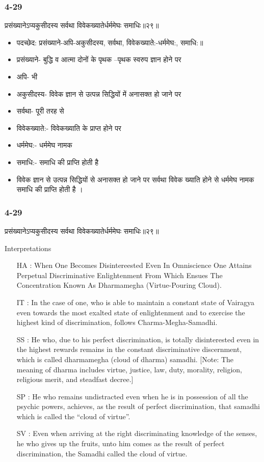 \begin{frame}[fragile]\frametitle{4-29}
\begin{sanskrit}
प्रसंख्यानेऽप्यकुसीदस्य सर्वथा विवेकख्यातेर्धर्ममेघः समाधिः॥२९॥
\end{sanskrit}

\begin{itemize}
\item पदच्छेद:  ‌प्रसंख्याने-अपि-अकुसीदस्य, सर्वथा, विवेकख्याते:-धर्ममेघ:, समाधि:॥
\item प्रसंख्याने- बुद्धि व आत्मा दोनों के पृथक –पृथक स्वरुप ज्ञान होने पर
\item अपि- भी
\item अकुसीदस्य- विवेक ज्ञान से उत्पन्न सिद्धियों में अनासक्त हो जाने पर
\item सर्वथा- पूरी तरह से
\item विवेकख्याते:- विवेकख्याति के प्राप्त होने पर
\item धर्ममेघ:- धर्ममेघ नामक
\item समाधि:- समाधि की प्राप्ति होती है
\item विवेक ज्ञान से उत्पन्न सिद्धियों से अनासक्त हो जाने पर सर्वथा विवेक ख्याति होने से धर्ममेघ नामक समाधि की प्राप्ति होती है ।
\end{itemize}
\end{frame}

\begin{frame}[fragile]\frametitle{4-29}
\begin{sanskrit}
प्रसंख्यानेऽप्यकुसीदस्य सर्वथा विवेकख्यातेर्धर्ममेघः समाधिः॥२९॥
\end{sanskrit}

Interpretations
\begin{itemize}	
\item [HA]: When One Becomes Disintereested Even In Omniscience One Attains Perpetual Discriminative Enlightenment From Which Ensues The Concentration Known As Dharmamegha (Virtue-Pouring Cloud).
\item [IT]: In the case of one, who is able to maintain a constant state of Vairagya even towards the most exalted state of enlightenment and to exercise the highest kind of discrimination, follows Charma-Megha-Samadhi.
\item [SS]: He who, due to his perfect discrimination, is totally disinterested even in the highest rewards remains in the constant discriminative discernment, which is called dharmamegha (cloud of dharma) samadhi. [Note: The meaning of dharma includes virtue, justice, law, duty, morality, religion, religious merit, and steadfast decree.]
\item [SP]: He who remains undistracted even when he is in possession of all the psychic powers, achieves, as the result of perfect discrimination, that samadhi which is called the “cloud of virtue”.
\item [SV]: Even when arriving at the right discriminating knowledge of the senses, he who gives up the fruits, unto him comes as the result of perfect discrimination, the Samadhi called the cloud of virtue. 
\end{itemize}
\end{frame}

